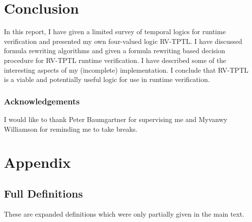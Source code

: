 \documentclass[a4paper]{article}
\begin{document}
\section{Conclusion}
In this report, I have given a limited survey of temporal logics for runtime verification and presented my own four-valued logic RV-TPTL. I have discussed formula rewriting algorithms and given a formula rewriting based decision procedure for RV-TPTL runtime verification. I have described some of the interesting aspects of my (incomplete) implementation. I conclude that RV-TPTL is a viable and potentially useful logic for use in runtime verification.

\subsubsection{Acknowledgements}
I would like to thank Peter Baumgartner for supervising me and Myvanwy Williamson for reminding me to take breaks.

\nocite{*}
\printbibliography{}
\newpage
\section{Appendix}\label{appendix}
\subsection{Full Definitions}\label{fulldef}
These are expanded definitions which were only partially given in the main text.
\end{document}
